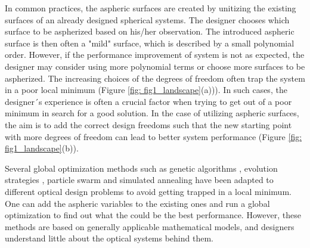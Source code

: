 In common practices, the aspheric surfaces are created by unitizing the existing surfaces of an already designed spherical systems. The designer chooses which surface to be aspherized based on his/her observation. The introduced aspheric surface is then often a "mild" surface, which is described by a small polynomial order. However, if the performance improvement of system is not as expected, the designer may consider using more polynomial terms or choose more surfaces to be aspherized. The increasing choices of the degrees of freedom often trap the system in a poor local minimum (Figure \ref{fig: fig1_landscape}(a))). In such cases, the designer´s experience is often a crucial factor when trying to get out of a poor minimum in search for a good solution. In the case of utilizing aspheric surfaces, the aim is to add the correct design freedoms such that the new starting point with more degrees of freedom can lead to better system performance (Figure \ref{fig: fig1_landscape}(b)). %


Several global optimization methods such as genetic algorithms \cite{Moore1999}, evolution strategies \cite{Nagar:18}, particle swarm \cite{MenkeParticleSwarm} and simulated annealing \cite{Forbes1991} have been adapted to different optical design problems to avoid getting trapped in a local minimum. One can add the aspheric variables to the existing ones and run a global optimization to find out what the could be the best performance. However, these methods are based on generally applicable mathematical models, and designers understand little about the optical systems behind them. 
 
